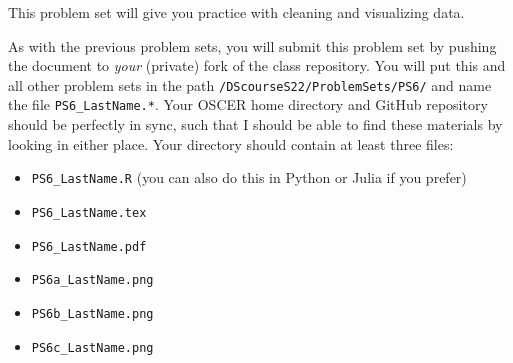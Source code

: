 \documentclass[12pt,english]{exam}
\begin{document}
This problem set will give you practice with cleaning and visualizing data.

As with the previous problem sets, you will submit this problem set by pushing the document to \emph{your} (private) fork of the class repository. You will put this and all other problem sets in the path \texttt{/DScourseS22/ProblemSets/PS6/} and name the file \texttt{PS6\_LastName.*}. Your OSCER home directory and GitHub repository should be perfectly in sync, such that I should be able to find these materials by looking in either place. Your directory should contain at least three files:
\begin{itemize}
    \item \texttt{PS6\_LastName.R} (you can also do this in Python or Julia if you prefer)
    \item \texttt{PS6\_LastName.tex}
    \item \texttt{PS6\_LastName.pdf}
    \item \texttt{PS6a\_LastName.png}
    \item \texttt{PS6b\_LastName.png}
    \item \texttt{PS6c\_LastName.png}
\end{itemize}
\end{document}
